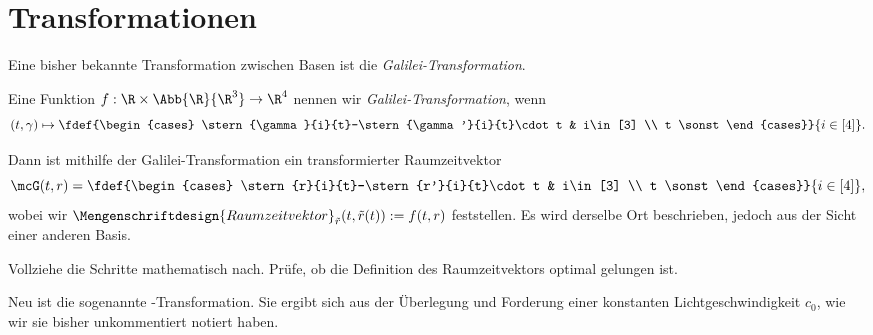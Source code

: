 \documentclass[../WiSe22ANA3.tex]{subfiles}
\begin{document}
		\section{Transformationen}
			\noindent Eine bisher bekannte Transformation zwischen Basen ist die \emph{Galilei-Transformation}. 
			\begin{info}
				Eine Funktion $f:\R\times\Abb{\R}{\R^3}\to\R^4$ nennen wir \emph{Galilei-Transformation}, wenn 
				$$(t,\gamma)\mapsto\fdef{\begin{cases}
					\stern{\gamma}{i}{t}-\stern{\gamma'}{i}{t}\cdot t & i\in[3] \\
					t \sonst
				\end{cases}}{i\in[4]}.$$
			\end{info}
			\noindent Dann ist mithilfe der Galilei-Transformation ein transformierter Raumzeitvektor 
			$$\mcG(t,r)=\\
				\fdef{\begin{cases}
				\stern{r}{i}{t}-\stern{r'}{i}{t}\cdot t & i\in[3] \\
				t \sonst
				\end{cases}}{i\in[4]},$$
			wobei wir $\Mengenschriftdesign{Raumzeitvektor}_{\tilde r}(t,\tilde r(t)):=f(t,r)$ feststellen. Es wird derselbe Ort beschrieben, jedoch aus der Sicht einer anderen Basis. 
			\begin{Aufgabe}
				\nr Vollziehe die Schritte mathematisch nach. Prüfe, ob die Definition des Raumzeitvektors optimal gelungen ist. 
			\end{Aufgabe}
			\noindent Neu ist die sogenannte \Lorentz-Transformation. Sie ergibt sich aus der Überlegung und Forderung einer konstanten Lichtgeschwindigkeit $c_0$, wie wir sie bisher unkommentiert notiert haben. 
				
\end{document}
